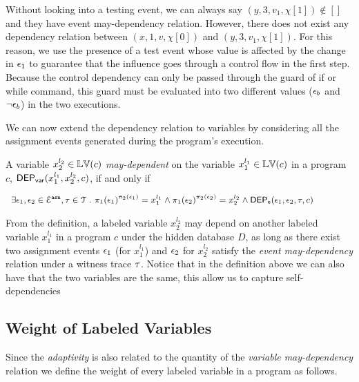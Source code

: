 Without looking into a testing event, we can always say $(y, 3, v_1, \chi[1]) \not\in []$ and they have event may-dependency relation.
However, there does not exist any dependency relation between $(x, 1, v, \chi[0])$ and $(y, 3, v_1, \chi[1])$.
For this reason, we use the presence of a test event whose value is affected by the change in $\mathtt{\epsilon}_1$
to guarantee that the influence goes through a control flow in the first step.
Because the control dependency can only be passed through the guard of if or while command, this guard must be evaluated into two different values ($\mathtt{\epsilon}_b$ and $\neg \mathtt{\epsilon}_b$) in the two executions.


We can now extend the dependency relation to variables by considering all the assignment events generated during the program’s execution. 

\begin{defn}
  \label{def:var_dep}
A variable ${x}_2^{l_2} \in \mathbb{LV}(c)$  \emph{may-dependent} on the 
  variable ${x}_1^{l_1} \in \mathbb{LV}(c)$ in a program ${c}$,
  $\mathsf{DEP_{var}}({x}_1^{l_1}, {x}_2^{l_2}, {c})$, if and only if
\begin{center}
$
{\small   \begin{array}{l}
\exists \event_1, \event_2 \in \eventset^{\asn}, \trace \in \mathcal{T} \st
\pi_{1}{(\event_1)}^{\pi_{2}{(\event_1)}} = {x}_1^{l_1}
\land
\pi_{1}{(\event_2)}^{\pi_{2}{(\event_2)}} = {x}_2^{l_2}%
\land 
\eventdep(\event_1, \event_2, \trace, c) 
  \end{array}
}%
$
\end{center}
  \end{defn}
{From the definition, a labeled variable $x_2^{l_2}$ may depend on another labeled variable $x_1^{l_1}$ in a program $c$ under the hidden database $D$, 
as long as there exist two assignment events $\mathtt{\epsilon}_1$ (for $x_1^{l_1}$) and $\mathtt{\epsilon}_2$ for $x_2^{l_2}$
satisfy the \emph{event may-dependency} relation under a witness trace $\mathtt{\tau}$.  
Notice that in the definition above we can also have that the two variables are the same,
this allow us to capture self-dependencies
}

\subsection{Weight of Labeled Variables}
\label{sec:dep}
Since the \emph{adaptivity} is also related to the quantity of
the \emph{variable may-dependency} relation
we define 
the weight of
every labeled variable in a program as follows.

